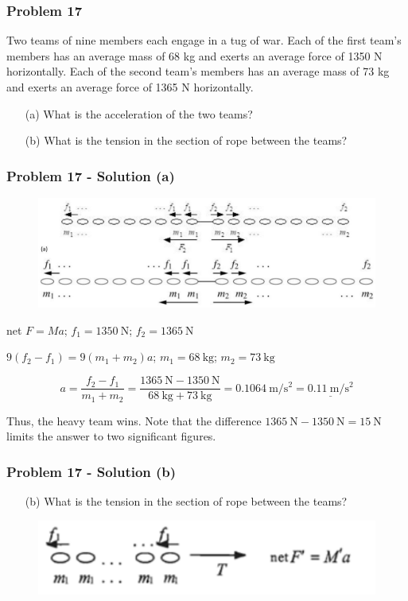 \documentclass{beamer}
\begin{document}
\begin{}
\begin{frame}
\frametitle{Problem 17}
Two teams of nine members each engage in a tug of war. Each of the first team's members has an average mass of 68 kg and exerts an average force of 1350 N horizontally. Each of the second team's members has an average mass of 73 kg and exerts an average force of 1365 N horizontally.
\begin{itemize}
    \item[(a)] What is the acceleration of the two teams?
    \item[(b)] What is the tension in the section of rope between the teams?
\end{itemize}
\end{frame}


\begin{frame}
\frametitle{Problem 17 - Solution (a)}
\begin{figure}
    \centering
    \includegraphics[width=0.7\linewidth]{CH4/Screenshot 2024-10-18 111908.png}
\end{figure}

net $F = Ma$; $f_1 = 1350 \mathrm{~N}$; $f_2 = 1365 \mathrm{~N}$

$9(f_2 - f_1) = 9(m_1 + m_2)a$; $m_1 = 68 \mathrm{~kg}$; $m_2 = 73 \mathrm{~kg}$

\begin{equation*}
a = \frac{f_2 - f_1}{m_1 + m_2} = \frac{1365 \mathrm{~N} - 1350 \mathrm{~N}}{68 \mathrm{~kg} + 73 \mathrm{~kg}} = 0.1064 \mathrm{~m} / \mathrm{s}^{2} = \underline{0.11 \mathrm{~m} / \mathrm{s}^{2}}
\end{equation*}

Thus, the heavy team wins. Note that the difference $1365 \mathrm{~N} - 1350 \mathrm{~N} = 15 \mathrm{~N}$ limits the answer to two significant figures.
\end{frame}

\begin{frame}
\frametitle{Problem 17 - Solution (b)}
\begin{itemize}
    \item[(b)] What is the tension in the section of rope between the teams?
\end{itemize}
\begin{figure}
    \centering
    \includegraphics[width=0.5\linewidth]{CH4/Screenshot 2024-10-20 145707.png}
\end{figure}


\end{frame}
\end{}
\end{document}
